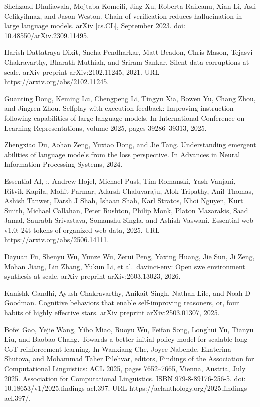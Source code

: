 Shehzaad Dhuliawala, Mojtaba Komeili, Jing Xu, Roberta Raileanu, Xian
Li, Asli Celikyilmaz, and Jason Weston. Chain-of-verification reduces
hallucination in large language models. arXiv {[}cs.CL{]}, September
2023. doi: 10.48550/arXiv.2309.11495.

Harish Dattatraya Dixit, Sneha Pendharkar, Matt Beadon, Chris Mason,
Tejasvi Chakravarthy, Bharath Muthiah, and Sriram Sankar. Silent data
corruptions at scale. arXiv preprint arXiv:2102.11245, 2021. URL
https://arxiv.org/abs/2102.11245.

Guanting Dong, Keming Lu, Chengpeng Li, Tingyu Xia, Bowen Yu, Chang
Zhou, and Jingren Zhou. Selfplay with execution feedback: Improving
instruction-following capabilities of large language models. In
International Conference on Learning Representations, volume 2025, pages
39286--39313, 2025.

Zhengxiao Du, Aohan Zeng, Yuxiao Dong, and Jie Tang. Understanding
emergent abilities of language models from the loss perspective. In
Advances in Neural Information Processing Systems, 2024.

Essential AI, :, Andrew Hojel, Michael Pust, Tim Romanski, Yash Vanjani,
Ritvik Kapila, Mohit Parmar, Adarsh Chaluvaraju, Alok Tripathy, Anil
Thomas, Ashish Tanwer, Darsh J Shah, Ishaan Shah, Karl Stratos, Khoi
Nguyen, Kurt Smith, Michael Callahan, Peter Rushton, Philip Monk, Platon
Mazarakis, Saad Jamal, Saurabh Srivastava, Somanshu Singla, and Ashish
Vaswani. Essential-web v1.0: 24t tokens of organized web data, 2025. URL
https://arxiv.org/abs/2506.14111.



Dayuan Fu, Shenyu Wu, Yunze Wu, Zerui Peng, Yaxing Huang, Jie Sun, Ji
Zeng, Mohan Jiang, Lin Zhang, Yukun Li, et al.~davinci-env: Open swe
environment synthesis at scale. arXiv preprint arXiv:2603.13023, 2026.

Kanishk Gandhi, Ayush Chakravarthy, Anikait Singh, Nathan Lile, and Noah
D Goodman. Cognitive behaviors that enable self-improving reasoners, or,
four habits of highly effective stars. arXiv preprint arXiv:2503.01307,
2025.

Bofei Gao, Yejie Wang, Yibo Miao, Ruoyu Wu, Feifan Song, Longhui Yu,
Tianyu Liu, and Baobao Chang. Towards a better initial policy model for
scalable long-CoT reinforcement learning. In Wanxiang Che, Joyce
Nabende, Ekaterina Shutova, and Mohammad Taher Pilehvar, editors,
Findings of the Association for Computational Linguistics: ACL 2025,
pages 7652--7665, Vienna, Austria, July 2025. Association for
Computational Linguistics. ISBN 979-8-89176-256-5. doi:
10.18653/v1/2025.findings-acl.397. URL
https://aclanthology.org/2025.findings-acl.397/.


